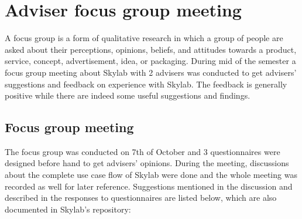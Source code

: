 \chapter{Adviser focus group meeting}

A focus group is a form of qualitative research in which a group of people are asked about their perceptions, opinions, beliefs, and attitudes towards a product, service, concept, advertisement, idea, or packaging\cite{citation15}. During mid of the semester a focus group meeting about Skylab with 2 advisers was conducted to get advisers' suggestions and feedback on experience with Skylab. The feedback is generally positive while there are indeed some useful suggestions and findings.

\section{Focus group meeting}

The focus group was conducted on 7th of October and 3 questionnaires were designed before hand to get advisers' opinions. During the meeting, discussions about the complete use case flow of Skylab were done and the whole meeting was recorded as well for later reference. Suggestions mentioned in the discussion and described in the responses to questionnaires are listed below, which are also documented in Skylab's repository:

